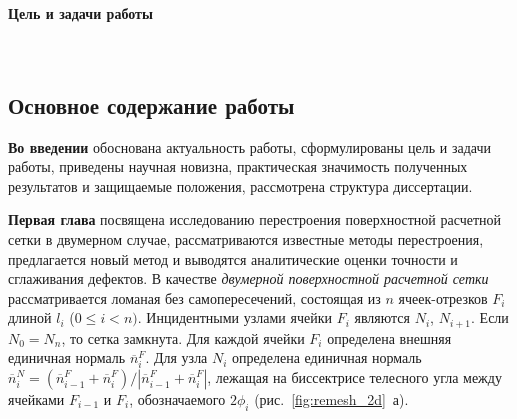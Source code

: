 \documentclass[a4paper,14pt]{extarticle}                     %
\theoremstyle{plain}                                         %
\begin{document}
\paragraph{Цель и задачи работы} \


























\newpage
\subsection*{Основное содержание работы}

\textbf{Во введении} обоснована актуальность работы, сформулированы цель и задачи работы, приведены научная новизна, практическая значимость полученных результатов и защищаемые положения, рассмотрена структура диссертации. 




\textbf{Первая глава} посвящена исследованию перестроения поверхностной расчетной сетки в двумерном случае, рассматриваются известные методы перестроения, предлагается новый метод и выводятся аналитические оценки точности и сглаживания дефектов.
В качестве \textit{двумерной поверхностной расчетной сетки} рассматривается ломаная без самопересечений, состоящая из $n$ ячеек-отрезков $F_i$ длиной $l_i$ ($0 \le i < n)$.
Инцидентными узлами ячейки $F_i$ являются $N_i$, $N_{i + 1}$.
Если $N_0 = N_n$, то сетка замкнута.
Для каждой ячейки $F_i$ определена внешняя единичная нормаль $\overline{n}_i^F$.
Для узла $N_i$ определена единичная нормаль $\overline{n}_i^N = (\overline{n}_{i-1}^F + \overline{n}_i^F) / |\overline{n}_{i-1}^F + \overline{n}_i^F|$, лежащая на биссектрисе телесного угла между ячейками $F_{i - 1}$ и $F_i$, обозначаемого $2 \phi_i$ (рис.~\ref{fig:remesh_2d}~а).
\end{document}
